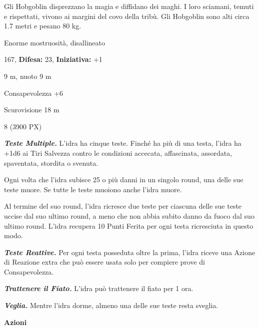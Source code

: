 \begin{multicols}{2}
{Gli Hobgoblin disprezzano la magia e diffidano dei maghi. I loro sciamani, temuti e rispettati, vivono ai margini del covo della tribù. Gli Hobgoblin sono alti circa 1.7 metri e pesano 80 kg.

\noindent
\begin{description}[noitemsep, topsep=0pt, parsep=0pt, partopsep=0pt, leftmargin=0cm, labelwidth=2.2cm]
	\item[\textbf{Taglia/Tipo:}] Enorme mostruosità, disallineato
	\item[\textbf{Caratt.:}] 
	\item[\textbf{Punti Ferita:}] 167,  \textbf{Difesa:} 23,  \textbf{Iniziativa:} +1
	\item[\textbf{Movimento:}] 9 m, nuoto 9 m
	\item[\textbf{Tiri Salvez.:}] 
	\item[\textbf{Comp.:}] Consapevolezza +6
	\item[\textbf{Sensi:}] Scurovisione 18 m
	\item[\textbf{Sfida:}] 8 (3900 PX)\smallskip
\end{description}

\emph{\textbf{Teste Multiple.}} L'idra ha cinque teste. Finché ha più di una testa, l'idra ha +1d6 ai Tiri Salvezza contro le condizioni accecata, affascinata, assordata, spaventata, stordita o svenuta.

Ogni volta che l'idra subisce 25 o più danni in un singolo round, una delle sue teste muore. Se tutte le teste muoiono anche l'idra muore.

Al termine del suo round, l'idra ricresce due teste per ciascuna delle sue teste uccise dal suo ultimo round, a meno che non abbia subito danno da fuoco dal suo ultimo round. L'idra recupera 10 Punti Ferita per ogni testa ricresciuta in questo modo.

\emph{\textbf{Teste Reattive.}} Per ogni testa posseduta oltre la prima, l'idra riceve una Azione di Reazione extra che può essere usata solo per compiere prove di Consapevolezza.

\emph{\textbf{Trattenere il Fiato.}} L'idra può trattenere il fiato per 1 ora.

\emph{\textbf{Veglia.}} Mentre l'idra dorme, almeno una delle sue teste resta sveglia.

\textbf{Azioni}

}
\end{multicols}
